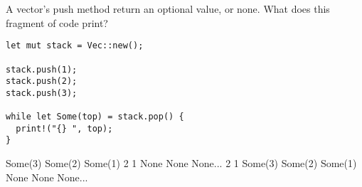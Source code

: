 %
%
A vector's push method return an optional value, or none. What does this fragment of code print?
\begin{lstlisting}
let mut stack = Vec::new();

stack.push(1);
stack.push(2);
stack.push(3);

while let Some(top) = stack.pop() {
  print!("{} ", top);
}
\end{lstlisting}
  \choice Some(3) Some(2) Some(1)
   2 1 None None None...
   2 1
  \choice Some(3) Some(2) Some(1) None None None...
